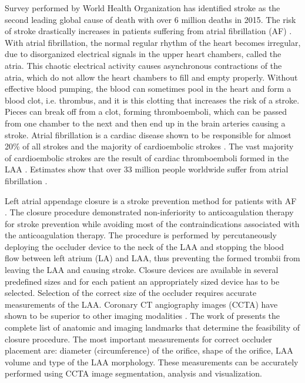 \documentclass[review]{elsarticle}
\begin{document}
Survey performed by World Health Organization
\cite{worldhealthorganization2017_top10causes} has identified stroke as the
second leading global cause of death with over 6 million deaths in 2015.  The
risk of stroke drastically increases in patients suffering from atrial
fibrillation (AF) \cite{korhonen2015_LeftAtrialAppendage}. 
With atrial fibrillation, the normal regular rhythm of the heart becomes
irregular, due to disorganized electrical signals in the upper heart chambers,
called the atria. This chaotic electrical activity causes asynchronous
contractions of the atria, which do not allow the heart chambers to fill and
empty properly. Without effective blood pumping, the blood can sometimes pool
in the heart and form a blood clot, i.e.
thrombus, and it is this clotting that increases the risk of a stroke. Pieces
can break off from a clot, forming thromboemboli, which can be passed from one chamber to the next
and then end up in the brain arteries causing a stroke.
Atrial fibrillation is a cardiac disease shown to be responsible for almost
20\% of all strokes \cite{budge2008_Analysisvivoleft} and the majority of
cardioembolic strokes \cite{korhonen2015_LeftAtrialAppendage}.  The vast
majority of cardioembolic strokes are the result of cardiac thromboemboli
formed in the LAA
\cite{blackshear1996_Appendageobliterationreduce,goldman1999_Pathophysiologiccorrelatesthromboembolism}.
Estimates show that over 33 million people worldwide suffer from atrial
fibrillation \cite{chugh2013_WorldwideEpidemiologyAtrial}.

Left atrial appendage closure is a stroke prevention method for patients with
AF
 \cite{panaich2017_LeftAtrialAppendage}. The closure
procedure demonstrated non-inferiority to anticoagulation therapy for stroke
prevention \cite{holmes2015_LeftAtrialAppendage,reddy2013_LeftAtrialAppendage}
while avoiding most of the contraindications associated with the
anticoagulation therapy.  The procedure is performed by percutaneously
deploying the occluder device to the neck of the LAA and stopping the blood
flow between left atrium (LA) and LAA, thus preventing the formed trombii from
leaving the LAA and causing stroke. Closure devices are available in
several predefined sizes and for each patient an appropriately sized device has
to be selected. Selection of the correct size of the occluder requires
accurate measurements of the LAA. Coronary CT angiography images (CCTA)
have shown to be superior to other imaging modalities
\cite{saw2016_ComparingMeasurementsCT,goitein2017_CardiacCTAngiography,wunderlich2015_PercutaneousInterventionsLeft,cabrera2014_Leftatrialappendage}.
The work of \cite{cabrera2014_Leftatrialappendage} presents the complete list
of anatomic and imaging landmarks that determine the feasibility of closure
procedure. The most important measurements for correct occluder placement are:
diameter (circumference) of the orifice, shape of the orifice, LAA 
volume and type of the LAA morphology.  These  measurements can be accurately
performed using CCTA image segmentation, analysis and visualization. 
\end{document}
